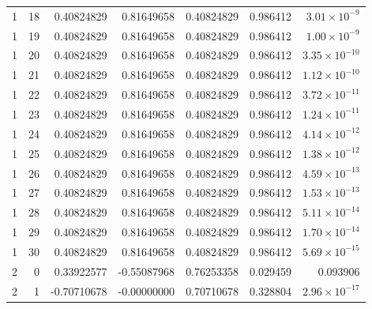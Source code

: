 {\begin{longtable}{rrrrrrr}
1 & 18 & 0.40824829 & 0.81649658 & 0.40824829 & 0.986412 & $3.01\times10^{-9}$ \\
1 & 19 & 0.40824829 & 0.81649658 & 0.40824829 & 0.986412 & $1.00\times10^{-9}$ \\
1 & 20 & 0.40824829 & 0.81649658 & 0.40824829 & 0.986412 & $3.35\times10^{-10}$ \\
1 & 21 & 0.40824829 & 0.81649658 & 0.40824829 & 0.986412 & $1.12\times10^{-10}$ \\
1 & 22 & 0.40824829 & 0.81649658 & 0.40824829 & 0.986412 & $3.72\times10^{-11}$ \\
1 & 23 & 0.40824829 & 0.81649658 & 0.40824829 & 0.986412 & $1.24\times10^{-11}$ \\
1 & 24 & 0.40824829 & 0.81649658 & 0.40824829 & 0.986412 & $4.14\times10^{-12}$ \\
1 & 25 & 0.40824829 & 0.81649658 & 0.40824829 & 0.986412 & $1.38\times10^{-12}$ \\
1 & 26 & 0.40824829 & 0.81649658 & 0.40824829 & 0.986412 & $4.59\times10^{-13}$ \\
1 & 27 & 0.40824829 & 0.81649658 & 0.40824829 & 0.986412 & $1.53\times10^{-13}$ \\
1 & 28 & 0.40824829 & 0.81649658 & 0.40824829 & 0.986412 & $5.11\times10^{-14}$ \\
1 & 29 & 0.40824829 & 0.81649658 & 0.40824829 & 0.986412 & $1.70\times10^{-14}$ \\
1 & 30 & 0.40824829 & 0.81649658 & 0.40824829 & 0.986412 & $5.69\times10^{-15}$ \\
2 & 0 & 0.33922577 & -0.55087968 & 0.76253358 & 0.029459 & 0.093906 \\
2 & 1 & -0.70710678 & -0.00000000 & 0.70710678 & 0.328804 & $2.96\times10^{-17}$ \\
\bottomrule
\end{longtable}
}

